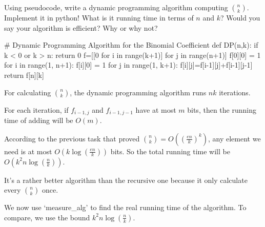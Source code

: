 \documentclass[11pt,a4paper,oneside]{article}
\begin{document}
\begin{problem}{4}
    Using pseudocode, write a dynamic programming algorithm
    computing ${n \choose k}$. Implement it in python! What is it running time
    in terms of $n$ and $k$?
    Would you say your algorithm is efficient? Why or why not?
    \solution
\begin{python}
# Dynamic Programming Algorithm for the Binomial Coefficient
def DP(n,k):
    if k < 0 or k > n: return 0
    f=[[0 for i in range(k+1)] for j in range(n+1)]
    f[0][0] = 1
    for i in range(1, n+1):
        f[i][0] = 1
        for j in range(1, k+1):
            f[i][j]=f[i-1][j]+f[i-1][j-1]
    return f[n][k]
\end{python}
    
	For calculating ${n \choose k}$, the dynamic programming algorithm runs $n k$ iterations.
	
	For each iteration, if $f_{i-1,j}$ and $f_{i-1,j-1}$ have at most $m$ bits, then the running time of adding will be $O(m)$.
    
	According to the previous task that proved ${n \choose k}=O((\frac{en}{k})^k)$, any element we need is at most $O(k\log(\frac{en}{k}))$ bits.
	So the total running time will be $O(k^2n\log(\frac{n}{k}))$.
    
    It's a rather better algorithm than the recursive one because it only calculate every ${n \choose k}$ once.
	
	We now use `measure\_alg' to find the real running time of the algorithm. To compare, we use the bound $k^2n\log(\frac{n}{k})$.


\end{problem}
\end{document}
